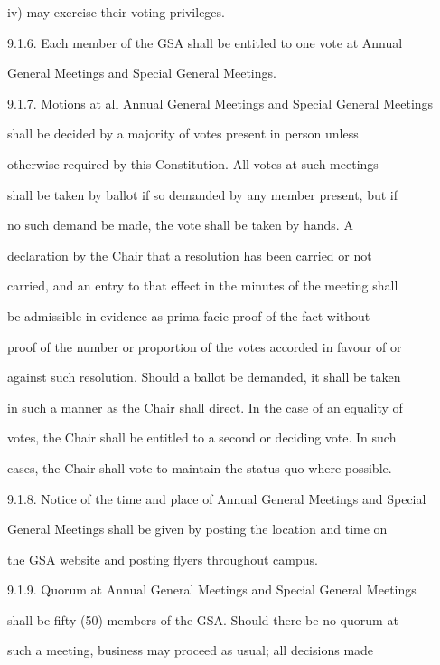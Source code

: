 \documentclass{article}
\begin{document}
iv)     may exercise their voting privileges.  



9.1.6. Each  member  of  the  GSA  shall  be  entitled  to  one  vote  at  Annual  

General Meetings and Special General Meetings.  



9.1.7. Motions at all Annual General Meetings and Special General Meetings  

shall  be  decided  by  a  majority  of  votes  present  in  person  unless  

otherwise  required  by  this  Constitution.  All  votes  at  such  meetings  

shall be taken by ballot if so demanded by any member present, but if  

no  such  demand  be  made,  the  vote  shall  be  taken  by  hands.  A  

declaration  by  the  Chair  that  a  resolution  has  been  carried  or  not  

carried, and an entry to that effect in the minutes of the meeting shall  

be  admissible  in  evidence  as  prima  facie  proof  of  the  fact  without  

proof of the number or proportion of the votes accorded in favour of or  

against such resolution. Should a ballot be demanded, it shall be taken  

in such a manner as the Chair shall direct. In the case of an equality of  

votes, the Chair shall be entitled to a second or deciding vote. In such  

cases, the Chair shall vote to maintain the status quo where possible.  



9.1.8. Notice of the time and place of Annual General Meetings and Special  

General Meetings shall be given by posting the location and time on  

the GSA website and posting flyers throughout campus.  



9.1.9. Quorum  at  Annual  General  Meetings  and  Special  General  Meetings  

shall be fifty (50) members of the GSA. Should there be no quorum at  

such  a  meeting,  business  may  proceed  as  usual;  all  decisions  made  
\end{document}
